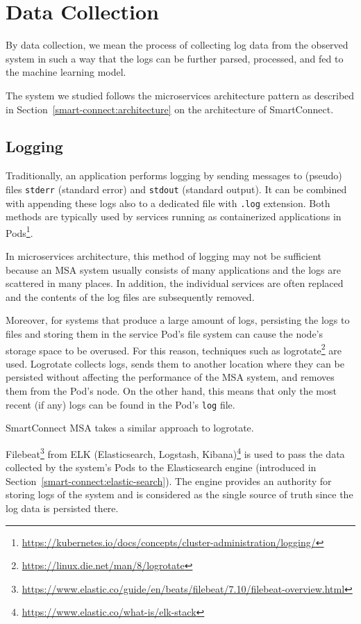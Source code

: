 \section{Data Collection}
\label{data_collection}
By data collection, we mean the process of collecting log data from the observed system in such a way that the logs can be further parsed, processed, and fed to the machine learning model.

The system we studied follows the microservices architecture pattern as described in Section~\ref{smart-connect:architecture} on the architecture of SmartConnect.\\

\subsection{Logging}

Traditionally, an application performs logging by sending messages to
(pseudo) files \texttt{stderr} (standard error) and \texttt{stdout} (standard output). It can be combined with appending these logs also to a dedicated file with \texttt{.log} extension. Both methods are typically used by services running as containerized applications in Pods\footnote{\url{https://kubernetes.io/docs/concepts/cluster-administration/logging/}}.

In microservices architecture, this method of logging may not be sufficient because an MSA system usually consists of many applications and the logs are scattered in many places. In addition, the individual services are often replaced and the contents of the log files are subsequently removed.

Moreover, for systems that produce a large amount of logs, persisting the logs to files and storing them in the service Pod's file system can cause the node's storage space to be overused. For this reason, techniques such as logrotate\footnote{\url{https://linux.die.net/man/8/logrotate}} are used. Logrotate collects logs, sends them to another location where they can be persisted without affecting the performance of the MSA system, and removes them from the Pod's node. On the other hand, this means that only the most recent (if any) logs can be found in the Pod's \texttt{log} file.

SmartConnect MSA takes a similar approach to logrotate.

Filebeat\footnote{\url{https://www.elastic.co/guide/en/beats/filebeat/7.10/filebeat-overview.html}} from ELK (Elasticsearch, Logstash, Kibana)\footnote{\url{https://www.elastic.co/what-is/elk-stack}} is used to pass the data collected by the system's Pods to the Elasticsearch engine (introduced in Section~\ref{smart-connect:elastic-search}). 
The engine provides an authority for storing logs of the system and is considered as the single source of truth since the log data is persisted there.

